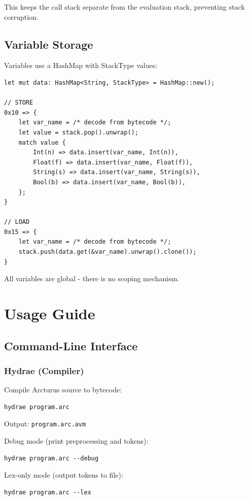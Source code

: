 \documentclass[11pt,a4paper]{article}
\begin{document}
This keeps the call stack separate from the evaluation stack, preventing stack corruption.

\subsection{Variable Storage}

Variables use a HashMap with StackType values:

\begin{lstlisting}[style=rustcode]
let mut data: HashMap<String, StackType> = HashMap::new();

// STORE
0x10 => {
    let var_name = /* decode from bytecode */;
    let value = stack.pop().unwrap();
    match value {
        Int(n) => data.insert(var_name, Int(n)),
        Float(f) => data.insert(var_name, Float(f)),
        String(s) => data.insert(var_name, String(s)),
        Bool(b) => data.insert(var_name, Bool(b)),
    };
}

// LOAD
0x15 => {
    let var_name = /* decode from bytecode */;
    stack.push(data.get(&var_name).unwrap().clone());
}
\end{lstlisting}

All variables are global - there is no scoping mechanism.

\newpage
\section{Usage Guide}

\subsection{Command-Line Interface}

\subsubsection{Hydrae (Compiler)}

Compile Arcturus source to bytecode:
\begin{verbatim}
hydrae program.arc
\end{verbatim}

Output: \texttt{program.arc.avm}

Debug mode (print preprocessing and tokens):
\begin{verbatim}
hydrae program.arc --debug
\end{verbatim}

Lex-only mode (output tokens to file):
\begin{verbatim}
hydrae program.arc --lex
\end{verbatim}
\end{document}
